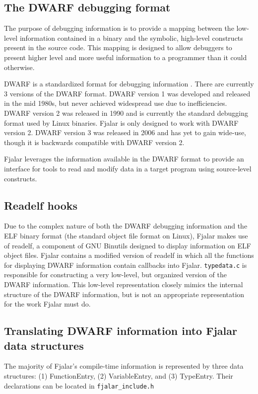 \documentclass[11pt]{article}
\begin{document}
\subsection{The DWARF debugging format}
The purpose of debugging information is to provide a mapping between
the low-level information contained in a binary and the symbolic,
high-level constructs present in the source code. This mapping is
designed to allow debuggers to present higher level and more useful
information to a programmer than it could otherwise.

DWARF is a standardized format for debugging information
\cite{silverstein1993dwarf}. There are currently 3 versions of the
DWARF format. DWARF version 1 was developed and released in the mid
1980s, but never achieved widespread use due to inefficiencies. DWARF
version 2 was released in 1990 and is currently the standard debugging
format used by Linux binaries. Fjalar is only designed to work with
DWARF version 2. DWARF version 3 was released in 2006 and has yet to
gain wide-use, though it is backwards compatible with DWARF version 2.

Fjalar leverages the information available in the DWARF format to
provide an interface for tools to read and modify data in a target
program using source-level constructs.


\subsection{Readelf hooks}
Due to the complex nature of both the DWARF debugging information and
the ELF binary format (the standard object file format on Linux),
Fjalar makes use of readelf, a component of GNU Binutils designed to
display information on ELF object files. Fjalar contains a modified
version of readelf in which all the functions for displaying DWARF
information contain callbacks into Fjalar. \texttt{typedata.c} is
responsible for constructing a very low-level, but organized version
of the DWARF information. This low-level representation closely mimics
the internal structure of the DWARF information, but is not an
appropriate representation for the work Fjalar must do.

\subsection{Translating DWARF information into Fjalar data structures}
The majority of Fjalar's compile-time information is represented by
three data structures: (1) FunctionEntry, (2) VariableEntry, and (3)
TypeEntry. Their declarations can be located in \texttt{fjalar\_include.h}
\end{document}

